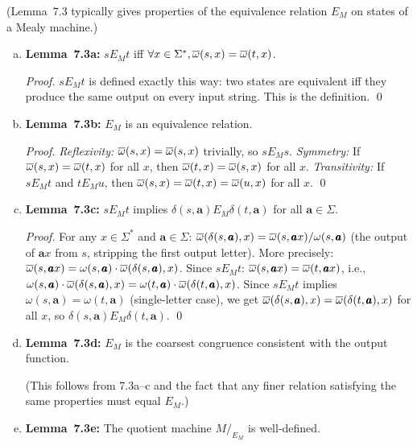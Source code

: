 \begin{enumerate}[{7.}1.]
(Lemma~7.3 typically gives properties of the equivalence relation $E_M$ on states of a Mealy machine.)

\begin{enumerate}[(a)]
  \item \textbf{Lemma~7.3a:} $s E_M t$ iff $\forall x\in\Sigma^*,\overline{\omega}(s,x)=\overline{\omega}(t,x)$.

  \begin{proof}
  $s E_M t$ is defined exactly this way: two states are equivalent iff they produce the same output on every input string.  This is the definition. \qed
  \end{proof}

  \item \textbf{Lemma~7.3b:} $E_M$ is an equivalence relation.

  \begin{proof}
  \emph{Reflexivity:} $\overline{\omega}(s,x)=\overline{\omega}(s,x)$ trivially, so $s E_M s$.
  \emph{Symmetry:} If $\overline{\omega}(s,x)=\overline{\omega}(t,x)$ for all $x$, then $\overline{\omega}(t,x)=\overline{\omega}(s,x)$ for all $x$.
  \emph{Transitivity:} If $s E_M t$ and $t E_M u$, then $\overline{\omega}(s,x)=\overline{\omega}(t,x)=\overline{\omega}(u,x)$ for all $x$. \qed
  \end{proof}

  \item \textbf{Lemma~7.3c:} $s E_M t$ implies $\delta(s,\pmb{a}) E_M \delta(t,\pmb{a})$ for all $\pmb{a}\in\Sigma$.

  \begin{proof}
  For any $x\in\Sigma^*$ and $\pmb{a}\in\Sigma$:
  $\overline{\omega}(\delta(s,\pmb{a}),x)=\overline{\omega}(s,\pmb{a}x)/\omega(s,\pmb{a})$ (the output of $\pmb{a}x$ from $s$, stripping the first output letter).
  More precisely: $\overline{\omega}(s,\pmb{a}x)=\omega(s,\pmb{a})\cdot\overline{\omega}(\delta(s,\pmb{a}),x)$.
  Since $s E_M t$: $\overline{\omega}(s,\pmb{a}x)=\overline{\omega}(t,\pmb{a}x)$, i.e., $\omega(s,\pmb{a})\cdot\overline{\omega}(\delta(s,\pmb{a}),x)=\omega(t,\pmb{a})\cdot\overline{\omega}(\delta(t,\pmb{a}),x)$.
  Since $s E_M t$ implies $\omega(s,\pmb{a})=\omega(t,\pmb{a})$ (single-letter case), we get $\overline{\omega}(\delta(s,\pmb{a}),x)=\overline{\omega}(\delta(t,\pmb{a}),x)$ for all $x$, so $\delta(s,\pmb{a}) E_M \delta(t,\pmb{a})$. \qed
  \end{proof}

  \item \textbf{Lemma~7.3d:} $E_M$ is the coarsest congruence consistent with the output function.

  (This follows from 7.3a--c and the fact that any finer relation satisfying the same properties must equal $E_M$.)

  \item \textbf{Lemma~7.3e:} The quotient machine $M/_{E_M}$ is well-defined.


\end{enumerate}
\end{enumerate}
